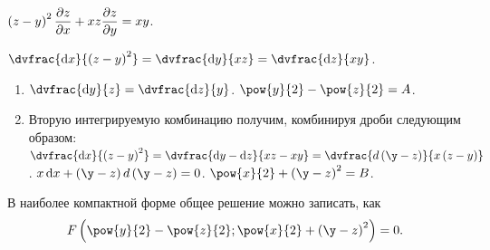 \documentclass[a5paper,10pt]{article}
\begin{document}
    $\left(\hspace{0.01em}z - y\hspace{0.01em}\right)^2 \dfrac{\partial z}{\partial x} + xz \dfrac{\partial z}{\partial y} = xy$.

    $\dvfrac {\di x} {\br{z - y}^2}
    = \dvfrac {\di y} {xz}
    = \dvfrac {\di z} {xy}$.
    
    \begin{enumerate}
        \item $\dvfrac {\di y} {z} = \dvfrac {\di z} {y}$.
        $\pow{y}{2} - \pow{z}{2} = A$.
        
        \item Вторую интегрируемую комбинацию получим, комбинируя дроби следующим
        образом:
        $\dvfrac {\di x} {\br{z - y}^2}
        = \dvfrac {\di y - \di z} {xz - xy}
        = \dvfrac {d\br{\y - z}} {x\br{z - y}}$.
        $x \di x + \br{\y - z} d\br{\y - z} = 0$.
        $\pow{x}{2} + \br{\y - z}^2 = B$.
    \end{enumerate}
    
    В наиболее компактной форме общее решение можно записать, как
    $$F\br{\pow{y}{2} - \pow{z}{2}; \pow{x}{2} + \br{\y - z}^2} = 0.$$
\end{document}
